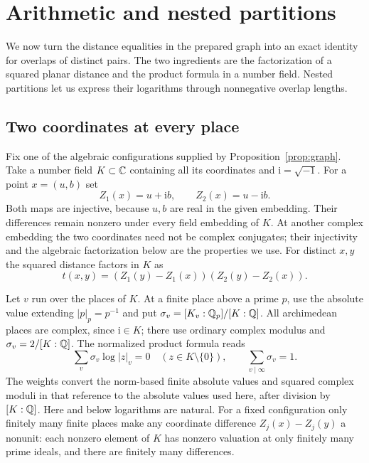 \section{Arithmetic and nested partitions}\label{sec:hierarchies}

We now turn the distance equalities in the prepared graph into an exact
identity for overlaps of distinct pairs.  The two ingredients are the
factorization of a squared planar distance and the product formula in a
number field.  Nested partitions let us express their logarithms through
nonnegative overlap lengths.

\subsection{Two coordinates at every place}

Fix one of the algebraic configurations supplied by
Proposition~\ref{prop:graph}.  Take a number field $K\subset\mathbb C$ containing
all its coordinates and $\mathrm i=\sqrt{-1}$.  For a point $x=(u,b)$ set
\[
 Z_1(x)=u+\mathrm i b,\qquad Z_2(x)=u-\mathrm i b.
\]
Both maps are injective, because $u,b$ are real in the given embedding.
Their differences remain nonzero under every field embedding of $K$.
At another complex embedding the two coordinates need not be complex
conjugates; their injectivity and the algebraic factorization below
are the properties we use.
For distinct $x,y$ the squared distance factors in $K$ as
\begin{equation}\label{eq:hier-factor}
 t(x,y)=(Z_1(y)-Z_1(x))(Z_2(y)-Z_2(x)).
\end{equation}

Let $v$ run over the places of $K$.  At a finite place above a prime $p$,
use the absolute value extending $|p|_p=p^{-1}$ and put
$\sigma_v=[K_v:\mathbb Q_p]/[K:\mathbb Q]$.  All archimedean places are complex,
since $\mathrm i\in K$; there use ordinary complex modulus and
$\sigma_v=2/[K:\mathbb Q]$.  The normalized product formula
\cite[Theorems~7.14--7.15 and Lemma~8.6]{ProductFormula} reads
\begin{equation}\label{eq:hier-product}
 \sum_v\sigma_v\log|z|_v=0\quad(z\in K\setminus\{0\}),
 \qquad \sum_{v\mid\infty}\sigma_v=1.
\end{equation}
The weights convert the norm-based finite absolute values and squared
complex moduli in that reference to the absolute values used here,
after division by $[K:\mathbb Q]$.
Here and below logarithms are natural.  For a fixed configuration only
finitely many finite places make any coordinate difference
$Z_j(x)-Z_j(y)$ a nonunit: each nonzero element of $K$ has nonzero
valuation at only finitely many prime ideals, and there are finitely
many differences.

